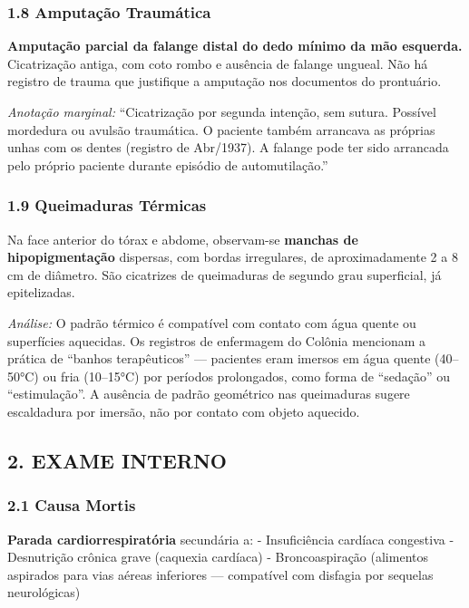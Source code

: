 \subsubsection*{1.8 Amputação Traumática}

\noindent \textbf{Amputação parcial da falange distal do dedo mínimo da mão esquerda.} Cicatrização antiga, com coto rombo e ausência de falange ungueal. Não há registro de trauma que justifique a amputação nos documentos do prontuário.

\noindent \textit{Anotação marginal:} ``Cicatrização por segunda intenção, sem sutura. Possível mordedura ou avulsão traumática. O paciente também arrancava as próprias unhas com os dentes (registro de Abr/1937). A falange pode ter sido arrancada pelo próprio paciente durante episódio de automutilação.''

\subsubsection*{1.9 Queimaduras Térmicas}

\noindent Na face anterior do tórax e abdome, observam-se \textbf{manchas de hipopigmentação} dispersas, com bordas irregulares, de aproximadamente 2 a 8 cm de diâmetro. São cicatrizes de queimaduras de segundo grau superficial, já epitelizadas.

\noindent \textit{Análise:} O padrão térmico é compatível com contato com água quente ou superfícies aquecidas. Os registros de enfermagem do Colônia mencionam a prática de ``banhos terapêuticos'' --- pacientes eram imersos em água quente (40--50°C) ou fria (10--15°C) por períodos prolongados, como forma de ``sedação'' ou ``estimulação''. A ausência de padrão geométrico nas queimaduras sugere escaldadura por imersão, não por contato com objeto aquecido.

\subsection*{2. EXAME INTERNO}

\subsubsection*{2.1 Causa Mortis}

\noindent \textbf{Parada cardiorrespiratória} secundária a:
- Insuficiência cardíaca congestiva
- Desnutrição crônica grave (caquexia cardíaca)
- Broncoaspiração (alimentos aspirados para vias aéreas inferiores --- compatível com disfagia por sequelas neurológicas)

